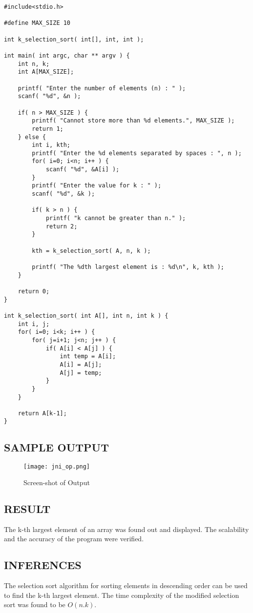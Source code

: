			\begin{lstlisting}
#include<stdio.h>

#define MAX_SIZE 10

int k_selection_sort( int[], int, int );

int main( int argc, char ** argv ) {
	int n, k;
	int A[MAX_SIZE];

	printf( "Enter the number of elements (n) : " );
	scanf( "%d", &n );

	if( n > MAX_SIZE ) {
		printf( "Cannot store more than %d elements.", MAX_SIZE );
		return 1;
	} else {
		int i, kth;
		printf( "Enter the %d elements separated by spaces : ", n );
		for( i=0; i<n; i++ ) {
			scanf( "%d", &A[i] );
		}
		printf( "Enter the value for k : " );
		scanf( "%d", &k );

		if( k > n ) {
			printf( "k cannot be greater than n." );
			return 2;
		}

		kth = k_selection_sort( A, n, k );

		printf( "The %dth largest element is : %d\n", k, kth );
	}

	return 0;
}

int k_selection_sort( int A[], int n, int k ) {
	int i, j;
	for( i=0; i<k; i++ ) {
		for( j=i+1; j<n; j++ ) {
			if( A[i] < A[j] ) {
				int temp = A[i];
				A[i] = A[j];
				A[j] = temp;
			}
		}
	}

	return A[k-1];
}
\end{lstlisting}
\newpage

	\subsection{SAMPLE OUTPUT}
		\begin{figure}[ht] 
			\centering
			\texttt{[image: jni\_op.png]}
			\caption{Screen-shot of Output}
		\end{figure} 

	\subsection{RESULT}
		\par The k-th largest element of an array was found out and displayed. The scalability and the accuracy of the program were verified.
	
	\subsection{INFERENCES}
		\par The selection sort algorithm for sorting elements in descending order can be used to find the k-th largest element. The time complexity of the modified selection sort was found to be $O(n.k)$.

\newpage  %